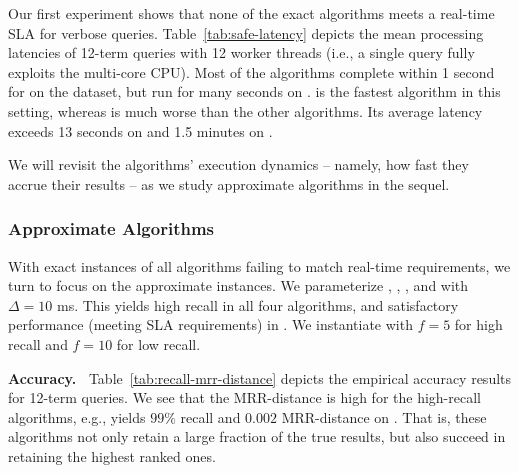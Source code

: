 Our first experiment shows that none of the exact algorithms meets a real-time SLA for  verbose queries. 
Table~\ref{tab:safe-latency} depicts the mean processing latencies of 12-term queries with 12 worker 
threads (i.e., a single query fully exploits the multi-core CPU). Most of the algorithms complete within 
1 second for on the {\cw} dataset, but run for many seconds on \cwten. 
{\pRA} is the fastest algorithm in this setting, whereas
\pNRA\/ is much worse than the other algorithms. Its average latency exceeds 
13 seconds on \cw\/ and 1.5 minutes on \cwten.

We will revisit the algorithms' execution dynamics -- namely, how fast they accrue their results -- 
as we study approximate algorithms in the sequel. 
 
\subsubsection{Approximate Algorithms}
 
With  exact instances of all  algorithms failing to match  real-time requirements, we turn to focus on the approximate instances. 
We parameterize \alg, \pRA, \pNRA, and \sNRA\/ with $\Delta=10$ ms. 
This yields high recall in all four algorithms,  and satisfactory performance (meeting SLA requirements) in \alg. 
We instantiate \pBMW\/ with $f=5$ for high recall and $f=10$ for low recall.  

{\bf Accuracy.\ } Table~\ref{tab:recall-mrr-distance} depicts the empirical accuracy results for 12-term queries. We see that the MRR-distance is high for the high-recall algorithms, 
e.g., \alg\hi\/ yields $99\%$ recall and $0.002$ MRR-distance on \cwten. That is, these 
algorithms not only  retain a large fraction of the true results, but also succeed in retaining the highest ranked ones. 

  
